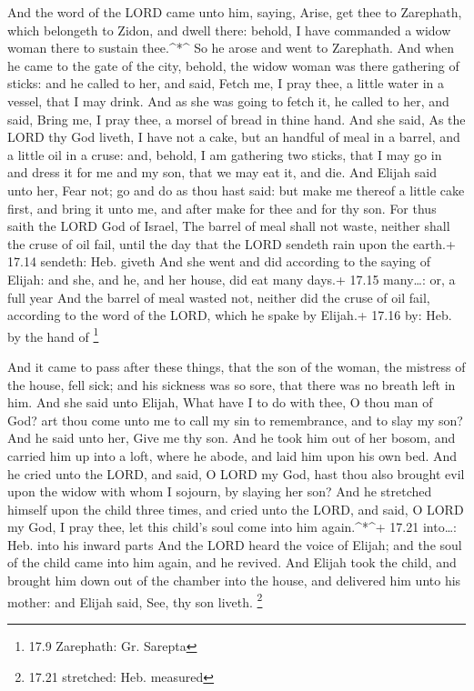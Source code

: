  And the word of the LORD came unto him, saying,
 Arise, get thee to Zarephath, which belongeth to Zidon, and
dwell there: behold, I have commanded a widow woman there to sustain
thee.\^{}*\^{}  So he arose and went to Zarephath. And when
he came to the gate of the city, behold, the widow woman was there
gathering of sticks: and he called to her, and said, Fetch me, I pray
thee, a little water in a vessel, that I may drink.  And as
she was going to fetch it, he called to her, and said, Bring me, I pray
thee, a morsel of bread in thine hand.  And she said, As
the LORD thy God liveth, I have not a cake, but an handful of meal in a
barrel, and a little oil in a cruse: and, behold, I am gathering two
sticks, that I may go in and dress it for me and my son, that we may eat
it, and die.  And Elijah said unto her, Fear not; go and do
as thou hast said: but make me thereof a little cake first, and bring it
unto me, and after make for thee and for thy son.  For thus
saith the LORD God of Israel, The barrel of meal shall not waste,
neither shall the cruse of oil fail, until the day that the LORD sendeth
rain upon the earth.+ 17.14 sendeth: Heb. giveth  And she
went and did according to the saying of Elijah: and she, and he, and her
house, did eat many days.+ 17.15 many\ldots: or, a full year
 And the barrel of meal wasted not, neither did the cruse
of oil fail, according to the word of the LORD, which he spake by
Elijah.+ 17.16 by: Heb. by the hand of \footnote{17.9 Zarephath: Gr.
  Sarepta}

 And it came to pass after these things, that the son of
the woman, the mistress of the house, fell sick; and his sickness was so
sore, that there was no breath left in him.  And she said
unto Elijah, What have I to do with thee, O thou man of God? art thou
come unto me to call my sin to remembrance, and to slay my son?
 And he said unto her, Give me thy son. And he took him out
of her bosom, and carried him up into a loft, where he abode, and laid
him upon his own bed.  And he cried unto the LORD, and
said, O LORD my God, hast thou also brought evil upon the widow with
whom I sojourn, by slaying her son?  And he stretched
himself upon the child three times, and cried unto the LORD, and said, O
LORD my God, I pray thee, let this child's soul come into him
again.\^{}*\^{}+ 17.21 into\ldots: Heb. into his inward parts
 And the LORD heard the voice of Elijah; and the soul of
the child came into him again, and he revived.  And Elijah
took the child, and brought him down out of the chamber into the house,
and delivered him unto his mother: and Elijah said, See, thy son liveth.
\footnote{17.21 stretched: Heb. measured}

